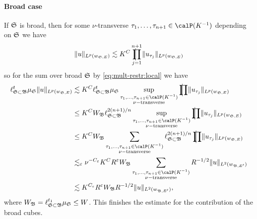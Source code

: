\paragraph{Broad case}
If $\mathfrak{S}$ is broad, then for some $\nu$-transverse $\tau_{1},\dotsc,\tau_{n+1} \in \Part{K^{-1}}$ depending on $\mathfrak{S}$ we have
\[
\norm{ u }_{L^{p}(w_{\bS,E})}
\lesssim
K^{C} \avprod_{j=1}^{n+1} \norm{ u_{\tau_{j}} }_{L^{p}(w_{\bS,E})}
\]
so for the sum over broad $\mathfrak{S}$ by \eqref{eq:mult-restr:local} we have
\begin{align*}
\ell^{t}_{\bS \subset \bB} \mu_{\bS} \norm{ u }_{L^{p}(w_{\bS,E})}
&\lesssim
K^{C} \ell^{t}_{\bS \subset \bB} \mu_{\bS}
\sup_{\substack{\tau_{1},\dotsc,\tau_{n+1}\in\Part{K^{-1}}\\ \nu-\text{transverse}}}
\avprod \norm{ u_{\tau_{j}} }_{L^{p}(w_{\bS,E})}\\
&\leq
K^{C} W_{\bB} \ell^{2(n+1)/n}_{\bS \subset \bB}
\sup_{\substack{\tau_{1},\dotsc,\tau_{n+1}\in\Part{K^{-1}}\\ \nu-\text{transverse}}}
\avprod \norm{ u_{\tau_{j}} }_{L^{p}(w_{\bS,E})}\\
&\leq
K^{C} W_{\bB}
\sum_{\substack{\tau_{1},\dotsc,\tau_{n+1}\in\Part{K^{-1}}\\ \nu-\text{transverse}}}
\ell^{2(n+1)/n}_{\bS \subset \bB} \avprod \norm{ u_{\tau_{j}} }_{L^{p}(w_{\bS,E})}\\
&\lesssim_{\epsilon}
\nu^{-C_{\epsilon}} K^{C} R^{\epsilon} W_{\bB}
\sum_{\substack{\tau_{1},\dotsc,\tau_{n+1}\in\Part{K^{-1}}\\ \nu-\text{transverse}}}
R^{-1/2} \norm{u}_{L^{2}(w_{\bB,E'})}\\
&\lesssim
K^{C_{\epsilon}} R^{\epsilon}
W_{\bB} R^{-1/2} \norm{u}_{L^{2}(w_{\bB,E'})},
\end{align*}
where $W_{\mathfrak{B}} = \ell^{t_{1}}_{\mathfrak{S} \subset \mathfrak{B}} \mu_{\mathfrak{S}} \leq W$.
This finishes the estimate for the contribution of the broad cubes.

